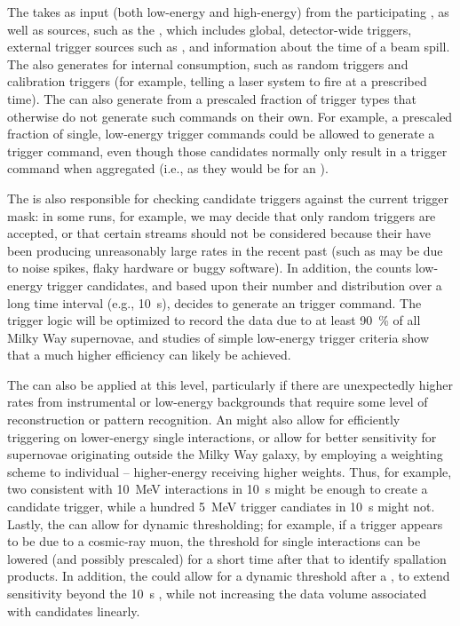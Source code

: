 The  takes as input  (both low-energy
and high-energy) from the participating , as well as
 sources, such as the , which includes
global, detector-wide triggers, external trigger sources such as
, and information about the time of a \fnal beam
spill. 
The   also generates  for internal
consumption, such as random triggers and calibration triggers (for
example, telling a laser system to fire at a prescribed time). 
The  can also generate  from a
prescaled fraction of trigger types that otherwise do not generate
such commands on their own. 
For example, a prescaled fraction of single, low-energy trigger
commands could be allowed to generate a trigger command, even though
those candidates normally only result in a trigger command when
aggregated (i.e., as they would be for an ).


The  is also responsible for checking candidate triggers
against the current  trigger mask: in some runs, for
example, we may decide that only random triggers are accepted, or that
certain  streams should not be considered
because their  have been producing unreasonably large
rates in the recent past (such as may be due to noise spikes, flaky
hardware or buggy software).
In addition, the  counts low-energy trigger candidates,
and based upon their number and distribution over a long time interval
(e.g., \SI{10}{\s}), decides to generate an  trigger command.
The trigger logic will be optimized to record the data due to at least
\SI{90}{\%} of all Milky Way supernovae, and studies of simple low-energy
trigger criteria show that a much higher efficiency can likely be
achieved.

	
The  can also be applied at this level, particularly if
there are unexpectedly higher rates from instrumental or low-energy
backgrounds that require some level of reconstruction or pattern
recognition. 
An  might also allow for efficiently triggering on
lower-energy single interactions, or allow for better sensitivity for
supernovae originating outside the Milky Way galaxy, by employing a weighting scheme to
individual  -- higher-energy
 receiving higher weights. 
Thus, for example, two  consistent with
\SI{10}{\MeV} interactions in \SI{10}{\s} might be enough to create a
 candidate trigger, while a hundred \SI{5}{\MeV} trigger
candiates in \SI{10}{\s} might not.
Lastly, the  can allow for dynamic thresholding; for
example, if a trigger appears to be due to a cosmic-ray muon, the
threshold for single interactions can be lowered (and possibly
prescaled) for a short time after that to identify spallation
products. 
In addition, the  could allow for a dynamic threshold after
a , to extend sensitivity beyond the \SI{10}{\s}
 , while not increasing the data
volume associated with  candidates linearly. 

